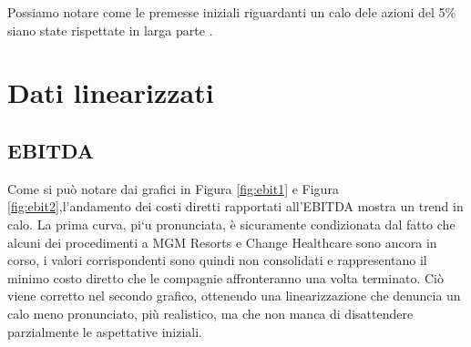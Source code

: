 \documentclass[12pt,a4paper,twoside]{report}
\begin{document}
Possiamo notare come le premesse iniziali riguardanti un calo dele azioni del 5\% siano state rispettate in larga parte \cite{accenture2010}.\\

\section{Dati linearizzati}
\subsection{EBITDA}
Come si pu\`o notare dai grafici in Figura \ref{fig:ebit1} e Figura \ref{fig:ebit2},l’andamento dei costi 
diretti rapportati all'EBITDA mostra un trend in calo. 
La prima curva, pi`u pronunciata, \`e sicuramente condizionata dal fatto che alcuni dei procedimenti a 
MGM Resorts e Change Healthcare sono ancora in corso, i valori corrispondenti sono quindi non consolidati e rappresentano 
il minimo costo diretto che le compagnie affronteranno una volta terminato.
 Ci\`o viene corretto nel secondo grafico, ottenendo una linearizzazione che denuncia un calo meno pronunciato, pi\`u realistico,
ma che non manca di disattendere parzialmente le aspettative iniziali.\\
\end{document}
